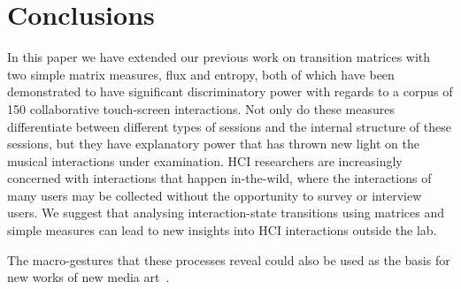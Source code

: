 \documentclass{sigchi}
\begin{document}
\section{Conclusions}

In this paper we have extended our previous work on transition
matrices with two simple matrix measures, flux and entropy, both of
which have been demonstrated to have significant discriminatory power
with regards to a corpus of 150 collaborative touch-screen
interactions. Not only do these measures differentiate between
different types of sessions and the internal structure of these
sessions, but they have explanatory power that has thrown new light on
the musical interactions under examination. HCI researchers are
increasingly concerned with interactions that happen in-the-wild,
where the interactions of many users may be collected without the
opportunity to survey or interview users. We suggest that analysing
interaction-state transitions using matrices and simple measures can
lead to new insights into HCI interactions outside the lab. 


The macro-gestures that these processes reveal could also be used as
the basis for new works of new media art~\cite{Manovich:2002ly}.



\end{document}

